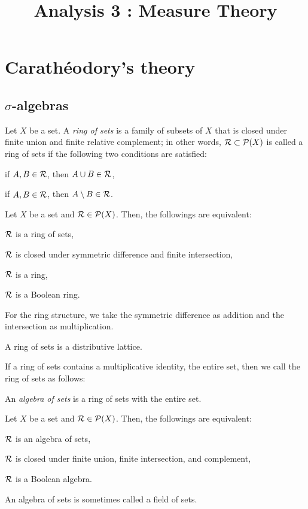 \documentclass{../crs}
\title{Analysis 3 : Measure Theory}
\begin{document}
\maketitle
\tableofcontents

\chapter{Carath\'eodory's theory}

\section{\texorpdfstring{$\sigma$}{Lg}-algebras}
\begin{defn}
Let $X$ be a set.
A \emph{ring of sets} is a family of subsets of $X$ that is closed under finite union and finite relative complement; in other words, $\mathcal{R}\subset\mathcal{P}(X)$ is called a ring of sets if the following two conditions are satisfied:
\begin{cond}
\item if $A,B\in\mathcal{R}$, then $A\cup B\in\mathcal{R}$,
\item if $A,B\in\mathcal{R}$, then $A\setminus B\in\mathcal{R}$.
\end{cond}
\end{defn}

\begin{prop}
Let $X$ be a set and $\mathcal{R}\in\mathcal{P}(X)$.
Then, the followings are equivalent:
\begin{cond}
\item $\mathcal{R}$ is a ring of sets,
\item $\mathcal{R}$ is closed under symmetric difference and finite intersection,
\item $\mathcal{R}$ is a ring,
\item $\mathcal{R}$ is a Boolean ring.
\end{cond}
For the ring structure, we take the symmetric difference as addition and the intersection as multiplication.
\end{prop}

\begin{prop}
A ring of sets is a distributive lattice.
\end{prop}


If a ring of sets contains a multiplicative identity, the entire set, then we call the ring of sets as follows:
\begin{defn}
An \emph{algebra of sets} is a ring of sets with the entire set.
\end{defn}
\begin{prop}
Let $X$ be a set and $\mathcal{R}\in\mathcal{P}(X)$.
Then, the followings are equivalent:
\begin{cond}
\item $\mathcal{R}$ is an algebra of sets,
\item $\mathcal{R}$ is closed under finite union, finite intersection, and complement,
\item $\mathcal{R}$ is a Boolean algebra.
\end{cond}
\end{prop}
An algebra of sets is sometimes called a field of sets.
\end{document}
